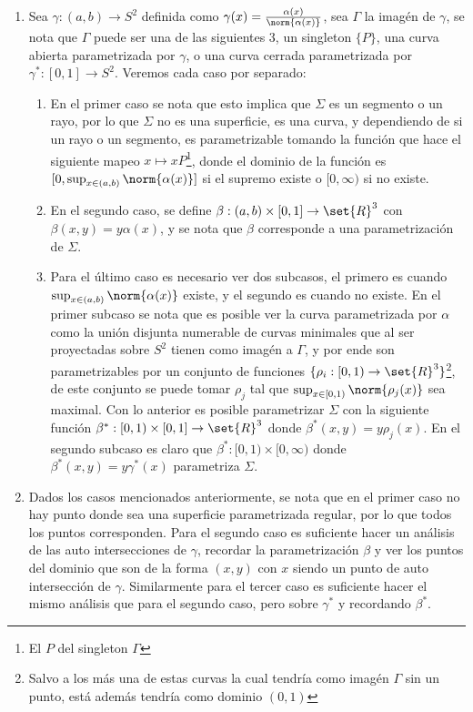 \documentclass{homework}
\begin{document}
\begin{sol}
    \begin{enumerate}
        \item Sea \(\gamma:(a,b)\rightarrow S^2\) definida como \(\gamma(x)=\frac{\alpha(x)}{\norm{\alpha(x)}}\), sea \(\Gamma\) la imagén de \(\gamma\), se nota que \(\Gamma\) puede ser una de las siguientes 3, un singleton \(\{P\}\),  una curva abierta parametrizada por \(\gamma\), o una curva cerrada parametrizada por \(\gamma^*:[0,1]\rightarrow S^2\). Veremos cada caso por separado:
        \begin{enumerate}[label=\roman*.]
            \item  En el primer caso se nota que esto implica que \(\Sigma\) es un segmento o un rayo, por lo que \(\Sigma\) no es una superficie, es una curva, y dependiendo de si un rayo o un segmento, es parametrizable tomando la función que hace el siguiente mapeo \(x\mapsto xP\)\footnote{El \(P\) del singleton \(\Gamma\)}, donde el dominio de la función es \([0,\sup_{x\in(a,b)}\norm{\alpha(x)}]\) si el supremo existe o \([0,\infty)\) si no existe.
            \item En el segundo caso, se define \(\beta:(a,b)\times[0,1]\rightarrow\set{R}^3\) con \(\beta(x,y)=y\alpha(x)\), y se nota que \(\beta\) corresponde a una parametrización de \(\Sigma\).
            \item Para el último caso es necesario ver dos subcasos, el primero es cuando \(\sup_{x\in(a,b)}\norm{\alpha(x)}\) existe, y el segundo es cuando no existe. En el primer subcaso se nota que es posible ver la curva parametrizada por \(\alpha\) como la unión disjunta numerable de curvas minimales que al ser proyectadas sobre \(S^2\) tienen como imagén a \(\Gamma\), y por ende son parametrizables por un conjunto de funciones \(\{\rho_i:[0,1)\rightarrow\set{R}^3\}\)\footnote{Salvo a los más una de estas curvas la cual tendría como imagén \(\Gamma\) sin un punto, está además tendría como dominio \((0,1)\)}, de este conjunto se puede tomar \(\rho_j\) tal que \(\sup_{x\in[0,1)}\norm{\rho_j(x)}\) sea maximal. Con lo anterior es posible parametrizar \(\Sigma\) con la siguiente función \(\beta^*:[0,1)\times[0,1]\rightarrow\set{R}^3\) donde \(\beta^*(x,y)=y\rho_j(x)\). En el segundo subcaso es claro que \(\beta^*:[0,1)\times[0,\infty)\) donde \(\beta^*(x,y)=y\gamma^*(x)\) parametriza \(\Sigma\).
        \end{enumerate}
        \item Dados los casos mencionados anteriormente, se nota que en el primer caso no hay punto donde sea una superficie parametrizada regular, por lo que todos los puntos corresponden. Para el segundo caso es suficiente hacer un análisis de las auto intersecciones de \(\gamma\), recordar la parametrización \(\beta\) y ver los puntos del dominio que son de la forma \((x,y)\) con \(x\) siendo un punto de auto intersección de \(\gamma\). Similarmente para el tercer caso es suficiente hacer el mismo análisis que para el segundo caso, pero sobre \(\gamma^*\) y recordando \(\beta^*\).

\end{enumerate}
\end{sol}
\end{document}
